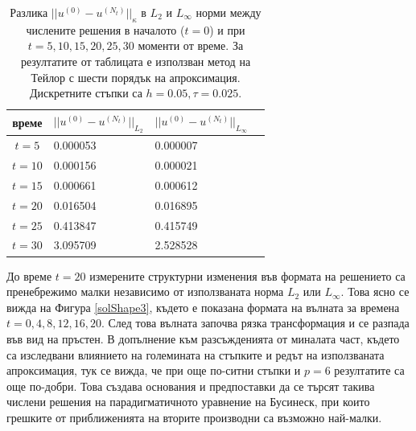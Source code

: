 \documentclass[a4paper]{article}
\theoremstyle{remark}
\begin{document}
\begin{large}
\begin{table}[ht]
\centering
\small
		\begin{tabular}{||c|l|l|l||}
			\hline
			\hline
  време   &  $||u^{(0)} - u^{(N_t)}||_{L_2}$  & $||u^{(0)} - u^{(N_t)}||_{L_\infty}$   \\
   		      \hline 
			\hline
  $t=5$     & 0.000053 & 0.000007      \\
			\hline 
  $t=10$   & 0.000156 & 0.000021      \\
			\hline 
  $t=15$   & 0.000661 & 0.000612      \\
	   \hline
  $t=20$   & 0.016504 & 0.016895      \\
			\hline
  $t=25$   & 0.413847 & 0.415749      \\
    \hline
  $t=30$   & 3.095709 & 2.528528       \\
	   \hline
		\hline 
		\end{tabular}
		\caption{Разлика $||u^{(0)} - u^{(N_t)}||_\kappa$ в $L_2$ и $L_\infty$ норми между числените решения в началото ($t=0$) и при $t=5, 10, 15, 20, 25, 30$ моменти от време. За резултатите от таблицата е използван метод на Тейлор с шести порядък на апроксимация. Дискретните стъпки са $h=0.05, \tau = 0.025$. }
\label{tableJ}
\end{table}
\FloatBarrier
До време $t=20$ измерените структурни изменения във формата на решението са пренебрежимо малки независимо от използваната норма $L_2$ или $L_\infty$. Това ясно се вижда на Фигура \ref{solShape3}, където е показана формата на вълната за времена $t=0,4,8,12,16,20$. След това вълната започва рязка трансформация и се разпада във вид на пръстен. В допълнение към разсъжденията от миналата част, където са изследвани влиянието на големината на стъпките и редът на използваната апроксимация, тук се вижда, че при още по-ситни стъпки и $p=6$ резултатите са още по-добри. Това създава основания и предпоставки да се търсят такива числени решения на парадигматичното уравнение на Бусинеск, при които грешките от приближенията на вторите производни са възможно най-малки.


\end{large}
\end{document}
